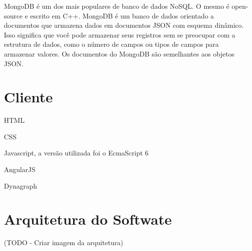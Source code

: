 MongoDB é um dos mais populares de banco de dados NoSQL. O mesmo é open-source e escrito em C++.
MongoDB é um banco de dados orientado a documentos que armazena dados em documentos JSON com esquema dinâmico. Isso significa que você pode armazenar seus registros sem se preocupar com a estrutura de dados, como o número de campos ou tipos de campos para armazenar valores. Os documentos do MongoDB são semelhantes aos objetos JSON.

\section{Cliente}

HTML

CSS

Javascript, a versão utilizada foi o EcmaScript 6 

AngularJS

Dynagraph

\section{Arquitetura do Softwate}

(TODO - Criar imagem da arquitetura)